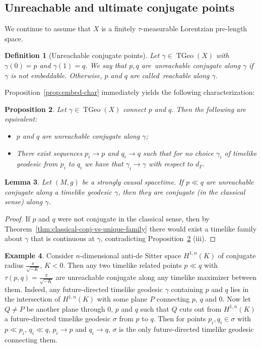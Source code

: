 \documentclass[a4paper,11pt]{article}
\numberwithin{equation}{section}
\theoremstyle{plain}
\newtheorem{Definition}{Definition}[section]
\newtheorem{Proposition}[Definition]{Proposition}
\newtheorem{Lemma}[Definition]{Lemma}
\theoremstyle{definition}
\newtheorem{Example}[Definition]{Example}
\DeclareMathOperator{\TGeo}{TGeo}
\begin{document}
\subsection{Unreachable and ultimate conjugate points}
\label{Subsection: unreachable and ultimate}

We continue to assume that $X$ is a finitely $\tau$-measurable Lorentzian pre-length space.

\begin{Definition}[Unreachable conjugate points]
Let $\gamma \in \TGeo(X)$ with $\gamma(0) = p$ and $\gamma(1) = q$. We say that $p,q$ are~\emph{unreachable conjugate along\/} $\gamma$ if $\gamma$ is not embeddable.
Otherwise, $p$ and $q$ are called~\emph{reachable\/} along $\gamma$.
\end{Definition}


Proposition~\ref{prop:embed-char} immediately yields the following characterization:
\begin{Proposition}\label{prop:unreachable-characterization} 
Let $\gamma\in \TGeo(X)$ connect $p$ and $q$. Then the following are equivalent:
\begin{itemize}
\item[(i)] $p$ and $q$ are unreachable conjugate along $\gamma$; 
\item[(ii)] There exist sequences $p_i\to p$ and $q_i\to q$ such that for no choice $\gamma_i$ of timelike
geodesic from $p_i$ to $q_i$ we have that $\gamma_i \to \gamma$ with respect to $d_\Gamma$.
\end{itemize}
\end{Proposition}
\begin{Lemma}\label{lem:unreachable_implies_standard_in_spacetimes}
Let $(M,g)$ be a strongly causal
spacetime. If $p\ll q$ are unreachable conjugate along a timelike geodesic $\gamma$, then they are conjugate (in the classical sense) along $\gamma$. 
\end{Lemma}
\begin{proof}
If $p$ and $q$ were not conjugate in the classical sense, then
by Theorem~\ref{thm:classical-conj-vs-unique-family} there would exist a
timelike family about $\gamma$ that is continuous at $\gamma$, contradicting
Proposition~\ref{prop:unreachable-characterization} (iii).
\end{proof}

\begin{Example}
    Consider $n$-dimensional anti-de Sitter space $H^{1,n}(K)$ of conjugate radius $\frac{\pi}{\sqrt{-K}}$, $K < 0$. Then any two timelike related points $p \ll q$ with $\tau(p,q) = \frac{\pi}{\sqrt{-K}}$ are unreachable conjugate along any timelike maximizer between them. Indeed, any future-directed timelike geodesic $\gamma$ containing $p$ and $q$ lies in the intersection of $H^{1,n}(K)$ with some plane $P$ connecting $p$, $q$ and $0$. Now let $Q\ne P$ be another plane through $0$, $p$ and $q$ such that $Q$ cuts out from $H^{1,n}(K)$ a future-directed timelike geodesic $\sigma$ from $p$ to $q$.  Then for points $p_i, q_i \in \sigma$ with $p\ll p_i$, $q_i\ll q$, $p_i\to p$ and $q_i\to q$, $\sigma$ is the only future-directed timelike geodesic connecting them.
\end{Example}
\end{document}
